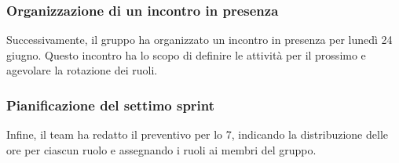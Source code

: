 \subsubsection{Organizzazione di un incontro in presenza}
\par Successivamente, il gruppo ha organizzato un incontro in presenza per lunedì 24 giugno. Questo incontro ha lo scopo di definire le attività per il prossimo  e agevolare la rotazione dei ruoli.

\subsubsection{Pianificazione del settimo sprint}
\par Infine, il team ha redatto il preventivo per lo  7, indicando la distribuzione delle ore per ciascun ruolo e assegnando i ruoli ai membri del gruppo.